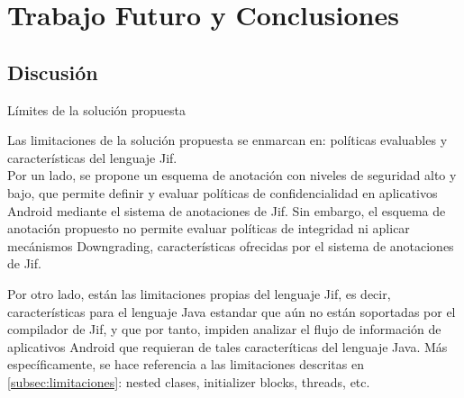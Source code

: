 \label{ch:trabajoFuturo}
\chapter{Trabajo Futuro y Conclusiones}
\section{Discusión}
Límites de la solución propuesta\newline

Las limitaciones de la solución propuesta se enmarcan en: políticas evaluables y
características del lenguaje Jif.\\
Por un lado, se propone un esquema de anotación con niveles de seguridad alto y
bajo, que permite definir y evaluar políticas de confidencialidad en aplicativos
Android mediante el sistema de anotaciones de Jif.
Sin embargo, el esquema de anotación propuesto no permite evaluar políticas de
integridad ni aplicar mecánismos Downgrading, características ofrecidas por el
sistema de anotaciones de Jif.

Por otro lado, están las limitaciones propias del lenguaje Jif, es decir,
características para el lenguaje Java estandar que aún no están soportadas por
el compilador de Jif, y que por tanto, impiden analizar el flujo de información
de aplicativos Android que requieran de tales caracteríticas del lenguaje Java.
Más específicamente, se hace referencia a las limitaciones descritas en
\ref{subsec:limitaciones}: nested clases, initializer blocks, threads, etc.



